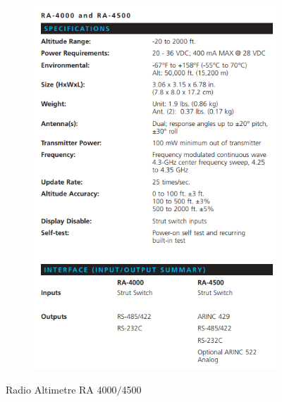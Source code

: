 \begin{figure}[H]
\begin{subfigure}[b]{0.4\textwidth}
	  \includegraphics[width=\textwidth]{./images/RA4000Specs.png}
	  \caption{}
	  \label{1diag2}
	  \end{subfigure}
	  \vspace{10pt}
	\caption{Radio Altimetre RA 4000$/$4500 \cite{Systems}}
	\label{diag1}
	\end{figure}
